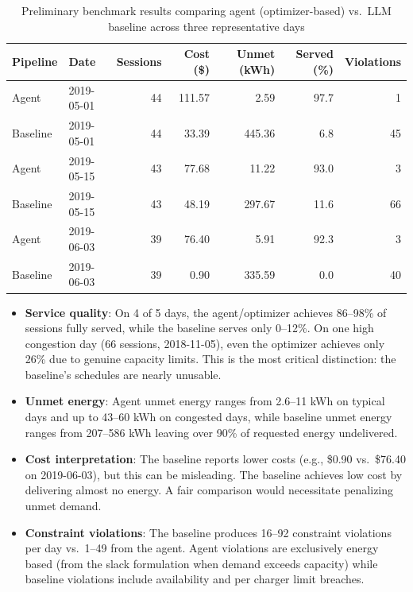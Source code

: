 \documentclass{article}
\begin{document}
\begin{table}[t]
\centering
\small
\begin{tabular}{llrrrrr}
\toprule
\textbf{Pipeline} & \textbf{Date} & \textbf{Sessions} & \textbf{Cost (\$)} & \textbf{Unmet (kWh)} & \textbf{Served (\%)} & \textbf{Violations} \\
\midrule
Agent    & 2019-05-01 & 44 & 111.57 & 2.59  & 97.7 & 1 \\
Baseline & 2019-05-01 & 44 & 33.39  & 445.36 & 6.8  & 45 \\
\midrule
Agent    & 2019-05-15 & 43 & 77.68  & 11.22 & 93.0 & 3 \\
Baseline & 2019-05-15 & 43 & 48.19  & 297.67 & 11.6 & 66 \\
\midrule
Agent    & 2019-06-03 & 39 & 76.40  & 5.91  & 92.3 & 3 \\
Baseline & 2019-06-03 & 39 & 0.90   & 335.59 & 0.0  & 40 \\
\bottomrule
\end{tabular}
\caption{Preliminary benchmark results comparing agent (optimizer-based) vs.\ LLM baseline across three representative days}
\label{tab:results}
\end{table}

\begin{itemize}
  \item \textbf{Service quality}: On 4 of 5 days, the agent/optimizer achieves 86--98\% of sessions fully served, while the baseline serves only 0--12\%. On one high congestion day (66 sessions, 2018-11-05), even the optimizer achieves only 26\% due to genuine capacity limits. This is the most critical distinction: the baseline's schedules are nearly unusable.
  \item \textbf{Unmet energy}: Agent unmet energy ranges from 2.6--11 kWh on typical days and up to 43--60 kWh on congested days, while baseline unmet energy ranges from 207--586 kWh leaving over 90\% of requested energy undelivered.
  \item \textbf{Cost interpretation}: The baseline reports lower costs (e.g., \$0.90 vs.\ \$76.40 on 2019-06-03), but this can be misleading. The baseline achieves low cost by delivering almost no energy. A fair comparison would necessitate penalizing unmet demand.
  \item \textbf{Constraint violations}: The baseline produces 16--92 constraint violations per day vs.\ 1--49 from the agent. Agent violations are exclusively energy based (from the slack formulation when demand exceeds capacity) while baseline violations include availability and per charger limit breaches.
\end{itemize}
\end{document}

